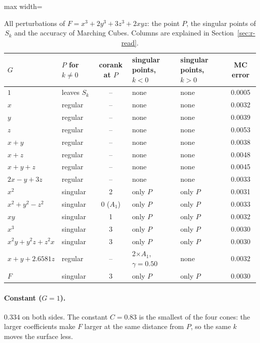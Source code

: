 \documentclass[12pt, a4paper]{article}
\theoremstyle{plain}
\theoremstyle{definition}
\theoremstyle{remark}
\theoremstyle{definition}
\begin{document}
\begin{table}[!h]
\centering
\footnotesize
\begin{adjustbox}{max width=\textwidth}
\begin{tabular}{l l c l l c}
\toprule
$G$ & $P$ for $k\neq0$ & corank at $P$ & singular points, $k<0$ & singular points, $k>0$ & MC error \\
\midrule
$1$ & leaves $S_k$ & -- & none & none & 0.0005 \\
$x$ & regular & -- & none & none & 0.0032 \\
$y$ & regular & -- & none & none & 0.0039 \\
$z$ & regular & -- & none & none & 0.0053 \\
$x+y$ & regular & -- & none & none & 0.0038 \\
$x+z$ & regular & -- & none & none & 0.0048 \\
$x+y+z$ & regular & -- & none & none & 0.0045 \\
$2x-y+3z$ & regular & -- & none & none & 0.0033 \\
$x^2$ & singular & 2 & only $P$ & only $P$ & 0.0031 \\
$x^2+y^2-z^2$ & singular & 0 ($A_1$) & only $P$ & only $P$ & 0.0033 \\
$xy$ & singular & 1 & only $P$ & only $P$ & 0.0032 \\
$x^3$ & singular & 3 & only $P$ & only $P$ & 0.0030 \\
$x^2y+y^2z+z^2x$ & singular & 3 & only $P$ & only $P$ & 0.0030 \\
$x+y+2.6581z$ & regular & -- & 2$\times$$A_1$, $\gamma=0.50$ & none & 0.0032 \\
$F$ & singular & 3 & only $P$ & only $P$ & 0.0030 \\
\bottomrule
\end{tabular}
\end{adjustbox}
\caption[Singular points for $x^3+2y^3+3z^3+2xyz$]{All perturbations of $F=x^3+2y^3+3z^3+2xyz$: the point $P$, the singular points of $S_k$ and the accuracy of Marching Cubes. Columns are explained in Section~\ref{sec:r-read}.}
\label{tab:r-E6d-points}
\end{table}
\paragraph{Constant ($G=1$).} $0.334$ on both sides. The constant $C=0.83$ is the
smallest of the four cones: the larger coefficients make $F$ larger at the same
distance from $P$, so the same $k$ moves the surface less.
\end{document}
